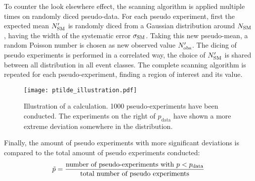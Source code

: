 To counter the look elsewhere effect, the scanning algorithm is applied multiple times on randomly diced pseudo-data. For each pseudo experiment, first the expected mean $N_\mathrm{SM}'$ is randomly diced from a Gaussian distribution around $N_\mathrm{SM}$, having the width of the systematic error $\sigma_\mathrm{SM}$. Taking this new pseudo-mean, a random Poisson number is chosen as new observed value $N_\mathrm{obs}'$. The dicing of pseudo experiments is performed in a correlated way, the choice of $N_\mathrm{SM}'$ is shared between all distribution in all event classes. The complete scanning algorithm is repeated for each pseudo-experiment, finding a region of interest and its \p value.
\begin{figure}[htbp]
	\center
	\texttt{[image: ptilde\_illustration.pdf]}
	\caption{Illustration of a \ptilde calculation. 1000 pseudo-experiments have been conducted. The experiments on the right of $p_\mathrm{data}$ have shown a more extreme deviation somewhere in the distribution.}
	\label{fig:ptilde_illustration}
\end{figure}
Finally, the amount of pseudo experiments with more significant deviations is compared to the total amount of pseudo experiments conducted:
\begin{equation}
	\tilde{p} = \frac{\text{number of pseudo-experiments with } p < p_\mathrm{data}}{\text{total number of pseudo experiments}}
\end{equation}



